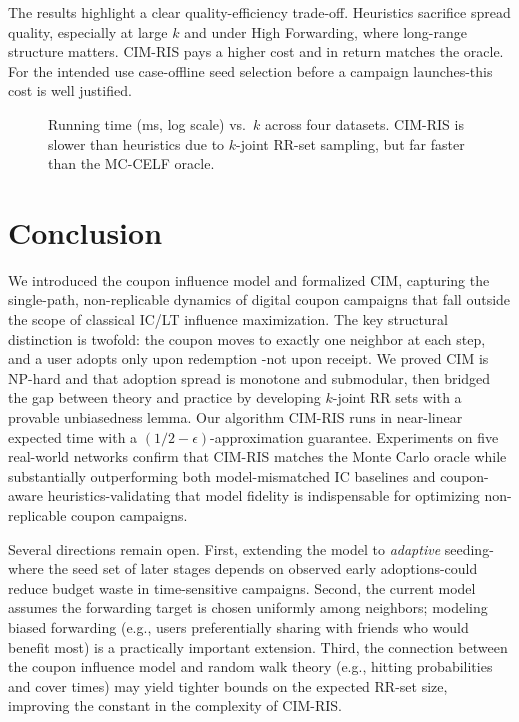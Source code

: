 \documentclass[sigconf]{acmart}
\newcommand{\CIMRIS}{\textsc{CIM-RIS}}
\begin{document}
The results highlight a clear quality-efficiency trade-off.
Heuristics sacrifice spread quality, especially at large $k$ and under
High Forwarding, where long-range structure matters.
\CIMRIS{} pays a higher cost and in return matches the oracle.
For the intended use case-offline seed selection before a campaign
launches-this cost is well justified.

\begin{figure}[t]
  \centering
  \caption{Running time (ms, log scale) vs.\ $k$ across four datasets.
    \CIMRIS{} is slower than heuristics due to $k$-joint RR-set
    sampling, but far faster than the MC-CELF oracle.}
  \label{fig:runtime}
\end{figure}

\section{Conclusion}
\label{sec:conclusion}

We introduced the coupon influence model and formalized CIM, capturing the
single-path, non-replicable dynamics of digital coupon campaigns that
fall outside the scope of classical IC/LT influence maximization.
The key structural distinction is twofold: the coupon moves to exactly
one neighbor at each step, and a user adopts only upon redemption
-not upon receipt.
We proved CIM is NP-hard and that adoption spread is monotone and
submodular, then bridged the gap between theory and practice by
developing $k$-joint RR sets with a provable unbiasedness lemma.
Our algorithm \CIMRIS{} runs in near-linear expected time with a
$(1/2{-}\epsilon)$-approximation guarantee.
Experiments on five real-world networks confirm that \CIMRIS{} matches
the Monte Carlo oracle while substantially outperforming both
model-mismatched IC baselines and coupon-aware heuristics-validating
that model fidelity is indispensable for optimizing non-replicable
coupon campaigns.

Several directions remain open.
First, extending the model to \emph{adaptive} seeding-where the
seed set of later stages depends on observed early adoptions-could
reduce budget waste in time-sensitive campaigns.
Second, the current model assumes the forwarding target is chosen
uniformly among neighbors; modeling biased forwarding
(e.g., users preferentially sharing with friends who would benefit
most) is a practically important extension.
Third, the connection between the coupon influence model and random walk theory
(e.g., hitting probabilities and cover times) may yield tighter bounds
on the expected RR-set size, improving the constant in the complexity
of \CIMRIS{}.
\end{document}
